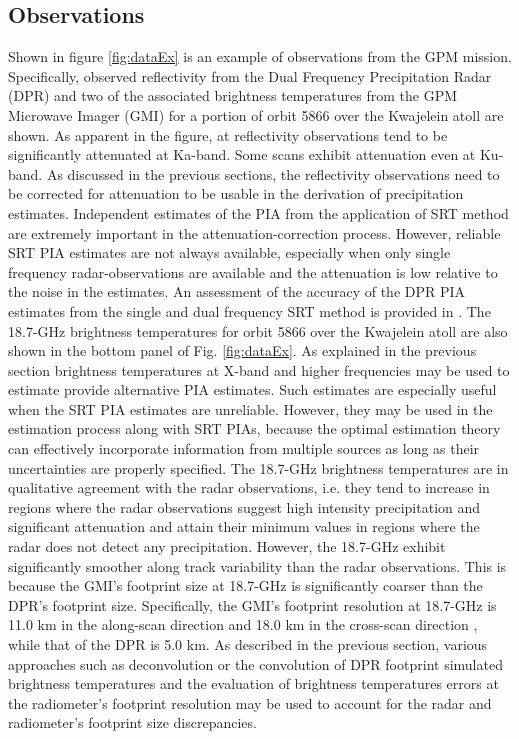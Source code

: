 \documentclass[10pt]{ietbook}
\begin{document}
\subsection{Observations}
Shown in figure \ref{fig:dataEx} is an example of observations from the GPM mission.
Specifically, observed reflectivity from the Dual Frequency Precipitation Radar (DPR) and two of the associated brightness temperatures
from the GPM Microwave Imager (GMI) \cite{gail2017} for a portion of orbit 5866 over the Kwajelein atoll are shown. 
As apparent in the figure, at reflectivity observations tend to be significantly attenuated 
at Ka-band. Some scans exhibit attenuation even at Ku-band.  As discussed in the previous sections, the reflectivity observations need
to be corrected for attenuation to be usable in the derivation of precipitation estimates. Independent estimates of the PIA from the application
of SRT method are extremely important in the attenuation-correction process.  However, reliable SRT PIA estimates are not always available,
especially when only single frequency radar-observations are available and the attenuation is low relative to the noise in the estimates.
An assessment of the accuracy of the DPR PIA estimates from the single and dual frequency SRT method is provided in \cite{meneghini2015}.
The 18.7-GHz brightness temperatures for orbit 5866 over the Kwajelein atoll are also shown in the bottom panel of Fig. \ref{fig:dataEx}.
As explained in the previous section brightness temperatures at X-band and higher frequencies may be used to estimate provide alternative PIA
estimates.  Such estimates are especially useful when the SRT PIA estimates are unreliable. However, they may be used in the estimation process along 
with SRT PIAs, because the optimal estimation theory can effectively incorporate information from multiple sources as long as their uncertainties are 
properly specified.  The 18.7-GHz brightness temperatures are in qualitative agreement with the radar observations, i.e. they tend to increase
in regions where the radar observations suggest high intensity precipitation and significant attenuation and attain their minimum values in regions
where the radar does not detect any precipitation.  However, the 18.7-GHz exhibit significantly smoother along track variability than the radar
observations.  This is because the GMI's footprint size at 18.7-GHz is significantly coarser than the DPR's footprint size. Specifically,
the GMI's footprint resolution at 18.7-GHz is 11.0 km in the along-scan direction and 18.0 km in the cross-scan direction \cite{gmi2015}, while that of the DPR is 5.0 km.  As described in the previous section,
various approaches such as deconvolution or the convolution of DPR footprint simulated brightness temperatures and the evaluation of brightness
temperatures errors at the radiometer's footprint resolution may be used to account for the radar and radiometer's footprint size discrepancies.
\end{document}
